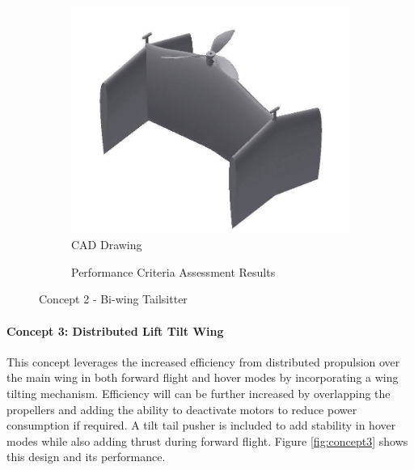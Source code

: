\begin{figure}[H]
\centering
\begin{subfigure}[t]{.5\textwidth}
  \centering
  \includegraphics[width=0.75\linewidth]{Concepts/CAD/5cad.jpg}
  \caption{CAD Drawing}
  \label{fig:cad2}
\end{subfigure}%
\begin{subfigure}[t]{.5\textwidth}
  \centering
  \caption{Performance Criteria Assessment Results}
  \label{fig:radar2}
\end{subfigure}
\caption{Concept 2 - Bi-wing Tailsitter}
\label{fig:concept2}
\end{figure}


\paragraph{Concept 3: Distributed Lift Tilt Wing}
This concept leverages the increased efficiency from distributed propulsion over the main wing in both forward flight and hover modes by incorporating a wing tilting mechanism. Efficiency will can be further increased by overlapping the propellers and adding the ability to deactivate motors to reduce power consumption if required. A tilt tail pusher is included to add stability in hover modes while also adding thrust during forward flight. Figure \ref{fig:concept3} shows this design and its performance.

